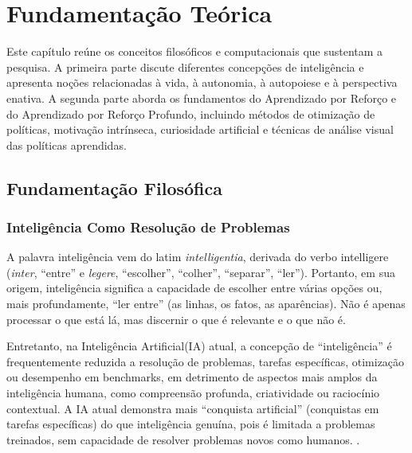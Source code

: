 \chapter{Fundamentação Teórica}
\label{cap:fundamentacao-teorica}

Este capítulo reúne os conceitos filosóficos e computacionais que sustentam a pesquisa. A primeira parte discute diferentes concepções de inteligência e apresenta noções relacionadas à vida, à autonomia, à autopoiese e à perspectiva enativa. A segunda parte aborda os fundamentos do Aprendizado por Reforço e do Aprendizado por Reforço Profundo, incluindo métodos de otimização de políticas, motivação intrínseca, curiosidade artificial e técnicas de análise visual das políticas aprendidas.

\section{Fundamentação Filosófica}

\subsection{Inteligência Como Resolução de Problemas}

A palavra inteligência vem do latim \textit{intelligentia}, derivada do verbo intelligere (\textit{inter}, ``entre'' e \textit{legere}, ``escolher'', ``colher'', ``separar'', ``ler'').  Portanto, em sua origem, inteligência significa a capacidade de escolher entre várias opções ou, mais profundamente, ``ler entre'' (as linhas, os fatos, as aparências). Não é apenas processar o que está lá, mas discernir o que é relevante e o que não é.

Entretanto, na Inteligência Artificial(IA) atual, a concepção de ``inteligência'' é frequentemente reduzida a resolução de problemas, tarefas específicas, otimização ou desempenho em benchmarks, em detrimento de aspectos mais amplos da inteligência humana, como compreensão profunda, criatividade ou raciocínio contextual. A IA atual demonstra mais ``conquista artificial'' (conquistas em tarefas específicas) do que inteligência genuína, pois é limitada a problemas treinados, sem capacidade de resolver problemas novos como humanos. \cite{bridging-the-gap}.

